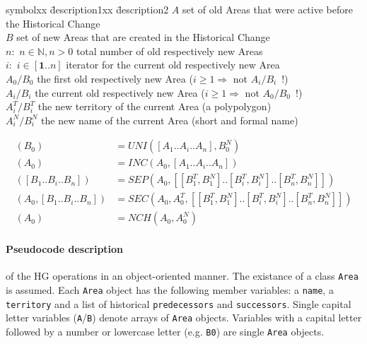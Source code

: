 \begin{addmargin}[1em]{0em}
\begin{tabbing}
  symbolxx \= description1xx \= description2 \kill
  $A$ \> set of old Areas that were active before the Historical Change \\
  $B$ \> set of new Areas that are created in the Historical Change \\
  $n:$ \> $n \in \mathbb{N}, n>0$ \> total number of old respectively new Areas \\
  $i:$ \> $i \in [\textbf{1} .. n]$ \> iterator for the current old respectively new Area \\
  $A_0/B_0$ \>    the first old respectively new Area ($i \geq 1 \Rightarrow$ not $A_i/B_i$~!) \\
  $A_i/B_i$ \>    the current old respectively new Area ($i \geq 1 \Rightarrow$ not $A_0/B_0$~!) \\
  $A_i^T/B_i^T$ \>the new territory of the current Area (a polypolygon) \\
  $A_i^N/B_i^N$ \>the new name of the current Area (short and formal name) \\
\end{tabbing}
\end{addmargin}

\vspace{-2.5em}
\begin{align*}
  (B_0)                       &= UNI([A_1 .. A_i .. A_n], B_0^N) \\
  (A_0)                       &= INC(A_0, [A_1 .. A_i .. A_n]) \\
  ([B_1 .. B_i .. B_n])       &= SEP(A_0, [[B_1^T, B_1^N] .. [B_i^T, B_i^N] .. [B_n^T, B_n^N]]) \\
  (A_0, [B_1 .. B_i .. B_n])  &= SEC(A_0, A_0^T, [[B_1^T, B_1^N] .. [B_i^T, B_i^N] .. [B_n^T, B_n^N]]) \\
  (A_0)                       &= NCH(A_0, A_0^N)
\end{align*}


\paragraph{Pseudocode description} %
\label{par:pseudocode_description}

of the HG operations in an object-oriented manner. The existance of a class \texttt{Area} is assumed. Each \texttt{Area} object has the following member variables: a \texttt{name}, a \texttt{territory} and a list of historical \texttt{predecessors} and \texttt{successors}. Single capital letter variables (\texttt{A}/\texttt{B}) denote arrays of \texttt{Area} objects. Variables with a capital letter followed by a number or lowercase letter (e.g. \texttt{B0}) are single \texttt{Area} objects.


